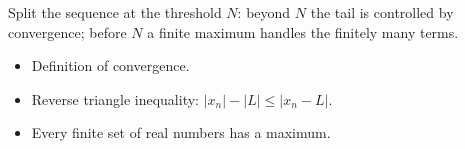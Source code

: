 \begin{remark*}
Split the sequence at the threshold $N$: beyond $N$ the tail is controlled
by convergence; before $N$ a finite maximum handles the finitely many terms.
\end{remark*}

\begin{remark*}[Dependencies]
\begin{itemize}
  \item Definition of convergence.
  \item Reverse triangle inequality: $|x_n| - |L| \le |x_n - L|$.
  \item Every finite set of real numbers has a maximum.
\end{itemize}
\end{remark*}
